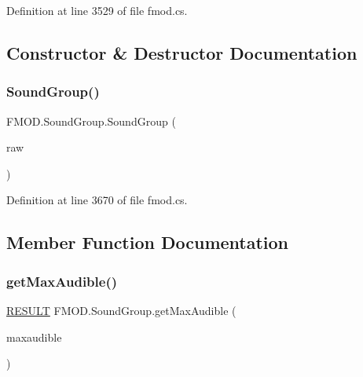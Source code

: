 Definition at line 3529 of file fmod.\+cs.



\subsection{Constructor \& Destructor Documentation}
\mbox{\label{class_f_m_o_d_1_1_sound_group_a5e378cf59fdf3f1ba8639d35243440a4}} 
\subsubsection{\texorpdfstring{Sound\+Group()}{SoundGroup()}}
{\footnotesize\ttfamily F\+M\+O\+D.\+Sound\+Group.\+Sound\+Group (\begin{DoxyParamCaption}\item[{Int\+Ptr}]{raw }\end{DoxyParamCaption})}



Definition at line 3670 of file fmod.\+cs.



\subsection{Member Function Documentation}
\mbox{\label{class_f_m_o_d_1_1_sound_group_adc8e64e12d32bfb5bd6fe06f3af8b6eb}} 
\subsubsection{\texorpdfstring{get\+Max\+Audible()}{getMaxAudible()}}
{\footnotesize\ttfamily \hyperlink{namespace_f_m_o_d_a305d1176ef3f8c8815861a60407ac33d}{R\+E\+S\+U\+LT} F\+M\+O\+D.\+Sound\+Group.\+get\+Max\+Audible (\begin{DoxyParamCaption}\item[{out int}]{maxaudible }\end{DoxyParamCaption})}



